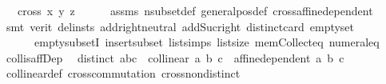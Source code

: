 \begin{isabellebody}
\ \ \ {\isachardoublequoteopen}cross{}\ x\ y\ z\ {\isasymnoteq}\ {}{\isachardoublequoteclose}\isanewline
%
\isadelimproof
\ \ %
\endisadelimproof
%
\isatagproof
{}\isamarkupfalse%
\ assms\ nsubset{\isacharunderscore}{\kern0pt}def\ general{\isacharunderscore}{\kern0pt}pos{\isacharunderscore}{\kern0pt}def\ cross{\isacharunderscore}{\kern0pt}affine{\isacharunderscore}{\kern0pt}dependent\isanewline
\ \ \isamarkupfalse%
\ {\isacharparenleft}{\kern0pt}smt\ {\isacharparenleft}{\kern0pt}verit{\isacharcomma}{\kern0pt}\ del{\isacharunderscore}{\kern0pt}insts{\isacharparenright}{\kern0pt}\ add{\isachardot}{\kern0pt}right{\isacharunderscore}{\kern0pt}neutral\ add{\isacharunderscore}{\kern0pt}Suc{\isacharunderscore}{\kern0pt}right\ distinct{\isacharunderscore}{\kern0pt}card\ empty{\isacharunderscore}{\kern0pt}set\ \isanewline
\ \ \ \ \ \ empty{\isacharunderscore}{\kern0pt}subsetI\ insert{\isacharunderscore}{\kern0pt}subset\ list{\isachardot}{\kern0pt}simps{\isacharparenleft}{\kern0pt}{}{}{\isacharparenright}{\kern0pt}\ list{\isachardot}{\kern0pt}size{\isacharparenleft}{\kern0pt}{}{\isacharcomma}{\kern0pt}{}{\isacharparenright}{\kern0pt}\ mem{\isacharunderscore}{\kern0pt}Collect{\isacharunderscore}{\kern0pt}eq\ numeral{\isacharunderscore}{\kern0pt}{}{\isacharunderscore}{\kern0pt}eq{\isacharunderscore}{\kern0pt}{}{\isacharparenright}{\kern0pt}%
\endisatagproof
{\isafoldproof}%
%
\isadelimproof
\isanewline
%
\endisadelimproof
\isanewline
{}\isamarkupfalse%
\ coll{\isacharunderscore}{\kern0pt}is{\isacharunderscore}{\kern0pt}affDep{\isacharcolon}{\kern0pt}\isanewline
\ \ {\isachardoublequoteopen}distinct\ {\isacharbrackleft}{\kern0pt}a{\isacharcomma}{\kern0pt}b{\isacharcomma}{\kern0pt}c{\isacharbrackright}{\kern0pt}\ {\isasymlongrightarrow}\ {\isacharparenleft}{\kern0pt}collinear{}\ a\ b\ c\ {\isasymlongleftrightarrow}\ affine{\isacharunderscore}{\kern0pt}dependent\ {\isacharbraceleft}{\kern0pt}a{\isacharcomma}{\kern0pt}\ b{\isacharcomma}{\kern0pt}\ c{\isacharbraceright}{\kern0pt}{\isacharparenright}{\kern0pt}{\isachardoublequoteclose}\isanewline
%
\isadelimproof
\ \ %
\endisadelimproof
%
\isatagproof
{}\isamarkupfalse%
\ collinear{}{\isacharunderscore}{\kern0pt}def\ cross{}{\isacharunderscore}{\kern0pt}commutation{\isacharunderscore}{\kern0pt}{}{}\ cross{}{\isacharunderscore}{\kern0pt}non{}{\isacharunderscore}{\kern0pt}distinct\isanewline

\end{isabellebody}
